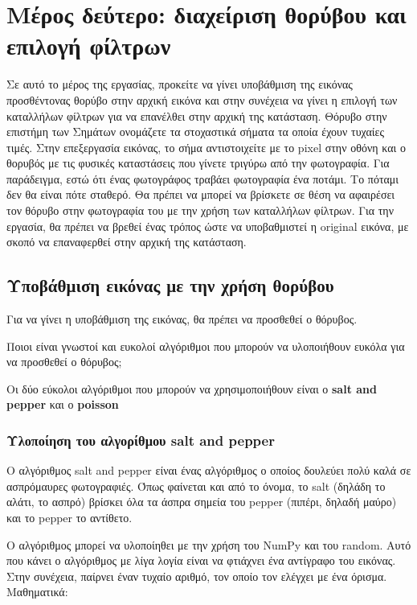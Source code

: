 \label{Chapter2}

\section{Μέρος δεύτερο: διαχείριση θορύβου και επιλογή φίλτρων}

Σε αυτό το μέρος της εργασίας, προκείτε να γίνει υποβάθμιση της εικόνας προσθέντονας θορύβο στην αρχική εικόνα και στην συνέχεια να γίνει η επιλογή των καταλλήλων φίλτρων για να επανέλθει στην αρχική της κατάσταση. 
Θόρυβο στην επιστήμη των Σημάτων ονομάζετε τα στοχαστικά σήματα τα οποία έχουν τυχαίες τιμές.
Στην επεξεργασία εικόνας, το σήμα αντιστοιχείτε με το pixel στην οθόνη και ο θορυβός με τις φυσικές καταστάσεις που γίνετε τριγύρω από την φωτογραφία.
Για παράδειγμα, εστώ ότι ένας φωτογράφος τραβάει φωτογραφία ένα ποτάμι. Το πόταμι δεν θα είναι πότε σταθερό.
Θα πρέπει να μπορεί να βρίσκετε σε θέση να αφαιρέσει τον θόρυβο στην φωτογραφία του με την χρήση των καταλλήλων φίλτρων.
Για την εργασία, θα πρέπει να βρεθεί ένας τρόπος ώστε να υποβαθμιστεί η original εικόνα, με σκοπό να επαναφερθεί στην αρχική της κατάσταση.

\subsection{Υποβάθμιση εικόνας με την χρήση θορύβου}

Για να γίνει η υποβάθμιση της εικόνας, θα πρέπει να προσθεθεί ο θόρυβος.

\begin{problem}
	Ποιοι είναι γνωστοί και ευκολοί αλγόριθμοι που μπορούν να υλοποιήθουν ευκόλα για να προσθεθεί ο θόρυβος;
\end{problem}

Οι δύο εύκολοι αλγόριθμοι που μπορούν να χρησιμοποιήθουν είναι ο \textbf{salt and pepper} και ο \textbf{poisson}

\subsubsection{Υλοποίηση του αλγορίθμου salt and pepper}

Ο αλγόριθμος salt and pepper είναι ένας αλγόριθμος ο οποίος δουλεύει πολύ καλά σε ασπρόμαυρες φωτογραφιές.
Όπως φαίνεται και από το όνομα, το salt (δηλάδη το αλάτι, το ασπρό) βρίσκει όλα τα άσπρα σημεία του pepper (πιπέρι, δηλαδή μαύρο) και το pepper το αντίθετο. \par
Ο αλγόριθμος μπορεί να υλοποίηθει με την χρήση του NumPy και του random. Αυτό που κάνει ο αλγόριθμος με λίγα λογία είναι να φτιάχνει ένα αντίγραφο του εικόνας.
Στην συνέχεια, παίρνει έναν τυχαίο αριθμό, τον οποίο τον ελέγχει με ένα όρισμα. Μαθηματικά:

